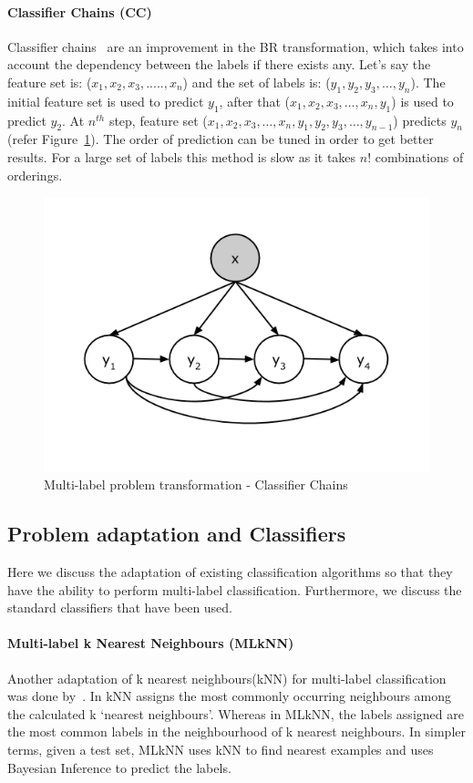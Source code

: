 \paragraph{Classifier Chains (CC)}
Classifier chains~\cite{dembczynski2010bayes, read2011classifier} are an improvement in the BR transformation, which takes into account the dependency between the labels if there exists any. Let's say the feature set is: ($x_1, x_2, x_3,....., x_n$) and the set of labels is: ($y_1, y_2, y_3,\ldots, y_n$). The initial feature set is used to predict $y_1$, after that ($x_1, x_2, x_3,\ldots, x_n, y_1$) is used to predict $y_2$. At $n^{th}$ step, feature set ($x_1, x_2, x_3,\ldots, x_n, y_1, y_2, y_3,\ldots, y_{n-1} $) predicts $y_n$ (refer Figure~\ref{fig:CC}). The order of prediction can be tuned in order to get better results. For a large set of labels this method is slow as it takes $n!$ combinations of orderings. 
\begin{figure}[!htb]
    \centering
    \includegraphics[scale=0.5]{Figures/ClassifierChains.png}
    \caption{Multi-label problem transformation - Classifier Chains}
    \label{fig:CC}
\end{figure}

\subsection{Problem adaptation and Classifiers}
Here we discuss the adaptation of existing classification algorithms so that they have the ability to perform multi-label classification. Furthermore, we discuss the standard classifiers that have been used. 

\paragraph{Multi-label k Nearest Neighbours (MLkNN)} 
Another adaptation of k nearest neighbours(kNN) for multi-label classification was done by~\cite{zhang2007ml}. In kNN assigns the most commonly occurring neighbours among the calculated k `nearest neighbours'. Whereas in MLkNN, the labels assigned are the most common labels in the neighbourhood of k nearest neighbours. In simpler terms, given a test set, MLkNN uses kNN to find nearest examples and uses Bayesian Inference to predict the labels.

